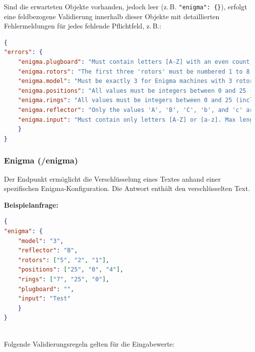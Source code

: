 \documentclass[12pt, ngerman, a4paper, numbers=noenddot]{article}
\begin{document}
Sind die erwarteten Objekte vorhanden, jedoch leer (z.\,B. \lstinline|"enigma": {}|), erfolgt eine feldbezogene Validierung innerhalb dieser Objekte mit detaillierten Fehlermeldungen für jedes fehlende Pflichtfeld, z.\,B.:

\begin{lstlisting}[language=json]
{
"errors": {
	"enigma.plugboard": "Must contain letters [A-Z] with an even count, maximum 26 letters, no separators allowed.",
	"enigma.rotors": "The first three 'rotors' must be numbered 1 to 8; if a fourth rotor is used, it must be 9 or 10.",
	"enigma.model": "Must be exactly 3 for Enigma machines with 3 rotors, and exactly 4 for machines with 4 rotors.",
	"enigma.positions": "All values must be integers between 0 and 25 (inclusive) and the array length must correspond to the number of rotors",
	"enigma.rings": "All values must be integers between 0 and 25 (inclusive) and the array length must correspond to the number of rotors",
	"enigma.reflector": "Only the values 'A', 'B', 'C', 'b', and 'c' are permitted.",
	"enigma.input": "Must contain only letters [A-Z] or [a-z]. Max length is 10000"
	}
}
\end{lstlisting}

\newpage
\subsubsection{Enigma (/enigma)}

Der Endpunkt ermöglicht die Verschlüsselung eines Textes anhand einer spezifischen Enigma-Konfiguration. Die Antwort enthält den verschlüsselten Text. 

\textbf{Beispielanfrage:}
\begin{lstlisting}[language=json, caption={Gültige Anfrage an /enigma}]
{
"enigma": {
	"model": "3",
	"reflector": "B",
	"rotors": ["5", "2", "1"],
	"positions": ["25", "0", "4"],
	"rings": ["7", "25", "0"],
	"plugboard": "",
	"input": "Test"
	}
}
\end{lstlisting}
\ \\
Folgende Validierungsregeln gelten für die Eingabewerte:
\end{document}
